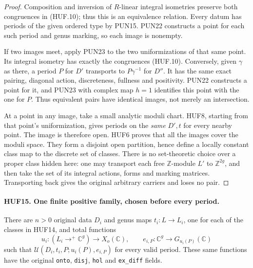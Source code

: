 \documentclass[11pt,a4paper]{article}
\numberwithin{equation}{section}
\theoremstyle{remark}\newtheorem{remark}[theorem]{Remark}
\begin{document}
\begin{proof}
Composition and inversion of \(R\)-linear integral
isometries preserve both congruences in (HUF.10);
thus this is an equivalence relation.
Every datum has periods of the given ordered type
by PUN15.  PUN22 constructs a point for each such
period and genus marking, so each image is nonempty.

If two images meet, apply PUN23 to the two
uniformizations of that same point.  Its integral
isometry has exactly the congruences (HUF.10).
Conversely, given \(\gamma\) as there, a period
\(P\) for \(D'\) transports to \(P\gamma^{-1}\)
for \(D''\).  It has the same exact pairing,
diagonal action, discreteness, fullness and positivity.
PUN22 constructs a point for it, and PUN23 with
complex map \(h=1\) identifies this point with the
one for \(P\).  Thus equivalent pairs have identical
images, not merely an intersection.

At a point in any image, take a small analytic
moduli chart.  HUF8, starting from that point's
uniformization, gives periods on the \emph{same}
\(D',t\) for every nearby point.  The image is
therefore open.  HUF6 proves that all the images
cover the moduli space.  They form a disjoint open
partition, hence define a locally constant class
map to the discrete set of classes.
There is no set-theoretic choice over a proper
class hidden here: one may transport each free
\(\mathbb Z\)-module \(L'\) to
\(\mathbb Z^{2g}\), and then take the set of
its integral actions, forms and marking matrices.
Transporting back gives the original arbitrary
carriers and loses no pair.
\end{proof}

\paragraph{HUF15. One finite positive family, chosen before every period.}
\label{claim:HUF15}
There are \(n>0\) original data \(D_i\) and genus
maps \(t_i:L\to L_i\), one for each of the classes
in HUF14, and total functions
\[
 u_i:(L_i\to^+\mathbb C^g)\to X_o(\mathbb C),\qquad
 e_{i,P}:\mathbb C^g\to G_{u_i(P)}(\mathbb C)
 \tag{HUF.11}
\]
such that \(\mathcal U(D_i,t_i,P;u_i(P),e_{i,P})\)
for every valid period.  These same functions have
the original \texttt{onto}, \texttt{disj},
\texttt{hol} and \texttt{ex\_\allowbreak diff} fields.
\end{document}
